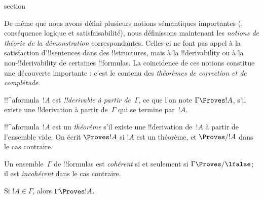 \documentclass[11pt,a4paper,openany]{memoir}
\begin{document}
\endgroup




\begingroup
\expandafter\def\csname ol@sectioncs\endcsname{section}
\def\olfilename{proof-theoretic-notions}


      {}
      {}


\begin{explain}
De même que nous avons défini plusieurs notions sémantiques importantes
(, conséquence logique et
satisfaisabilité), nous définissons maintenant les \emph{notions de
théorie de la démonstration} correspondantes. Celles-ci ne font pas
appel à la satisfaction d'!!{sentence}s dans des !!{structure}s, mais
à la !!{derivability} ou à la non-!!{derivability} de certaines
!!{formula}s. La coïncidence de ces notions constitue une découverte
importante : c'est le contenu des \emph{théorèmes de correction et de
complétude}.
\end{explain}

\begin{defn}[!!^{derivability}]
!!^a{formula}~$!A$ est \emph{!!{derivable} à partir de~$\Gamma$}, ce
que l'on note $\Gamma \Proves !A$, s'il existe une !!{derivation} à
partir de~$\Gamma$ qui se termine par~$!A$.
\end{defn}

\begin{defn}[Théorèmes]
!!^a{formula}~$!A$ est un \emph{théorème} s'il existe une
!!{derivation} de~$!A$ à partir de l'ensemble vide. On écrit
$\Proves !A$ si $!A$ est un théorème, et $\Proves/ !A$ dans le cas
contraire.
\end{defn}

\begin{defn}[Cohérence]
Un ensemble~$\Gamma$ de !!{formula}s est \emph{cohérent} si et seulement
si $\Gamma \Proves/ \lfalse$; il est \emph{incohérent} dans le cas
contraire.
\end{defn}

\begin{prop}[Réflexivité]
Si $!A \in \Gamma$, alors $\Gamma \Proves !A$.
\end{prop}
\end{document}
